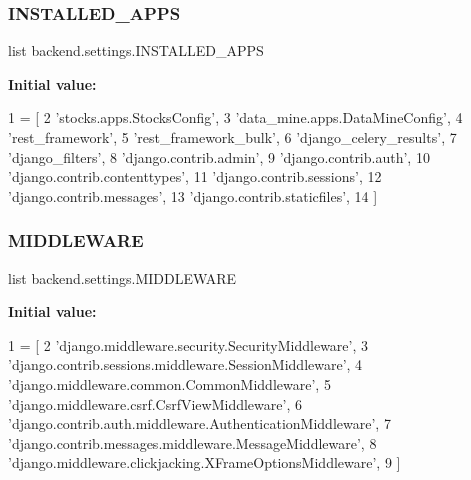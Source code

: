 \subsubsection{\texorpdfstring{I\+N\+S\+T\+A\+L\+L\+E\+D\+\_\+\+A\+P\+PS}{INSTALLED\_APPS}}
{\footnotesize\ttfamily list backend.\+settings.\+I\+N\+S\+T\+A\+L\+L\+E\+D\+\_\+\+A\+P\+PS}

{\bfseries Initial value\+:}
\begin{DoxyCode}
1 =  [
2     \textcolor{stringliteral}{'stocks.apps.StocksConfig'},
3     \textcolor{stringliteral}{'data\_mine.apps.DataMineConfig'}, 
4     \textcolor{stringliteral}{'rest\_framework'},
5     \textcolor{stringliteral}{'rest\_framework\_bulk'}, 
6     \textcolor{stringliteral}{'django\_celery\_results'},
7     \textcolor{stringliteral}{'django\_filters'}, 
8     \textcolor{stringliteral}{'django.contrib.admin'},
9     \textcolor{stringliteral}{'django.contrib.auth'},
10     \textcolor{stringliteral}{'django.contrib.contenttypes'},
11     \textcolor{stringliteral}{'django.contrib.sessions'},
12     \textcolor{stringliteral}{'django.contrib.messages'},
13     \textcolor{stringliteral}{'django.contrib.staticfiles'},
14 ]
\end{DoxyCode}
\mbox{\label{namespacebackend_1_1settings_aeccffb986095e4439b8ec0b46f3bb3c0}} 
\subsubsection{\texorpdfstring{M\+I\+D\+D\+L\+E\+W\+A\+RE}{MIDDLEWARE}}
{\footnotesize\ttfamily list backend.\+settings.\+M\+I\+D\+D\+L\+E\+W\+A\+RE}

{\bfseries Initial value\+:}
\begin{DoxyCode}
1 =  [
2     \textcolor{stringliteral}{'django.middleware.security.SecurityMiddleware'},
3     \textcolor{stringliteral}{'django.contrib.sessions.middleware.SessionMiddleware'},
4     \textcolor{stringliteral}{'django.middleware.common.CommonMiddleware'},
5     \textcolor{stringliteral}{'django.middleware.csrf.CsrfViewMiddleware'},
6     \textcolor{stringliteral}{'django.contrib.auth.middleware.AuthenticationMiddleware'},
7     \textcolor{stringliteral}{'django.contrib.messages.middleware.MessageMiddleware'},
8     \textcolor{stringliteral}{'django.middleware.clickjacking.XFrameOptionsMiddleware'},
9 ]
\end{DoxyCode}
\mbox{\label{namespacebackend_1_1settings_a9e253faecd3d816e9d132703ca1edea6}} 
